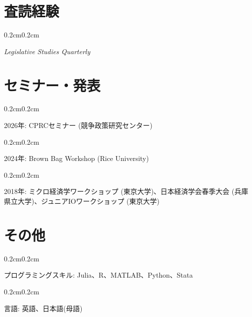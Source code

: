 \documentclass[10pt, letterpaper]{article}
\newenvironment{onecolentry}{
    \begin{adjustwidth}{0.2cm}{0.2cm}
}{
    \end{adjustwidth}
}
\begin{document}
    \section{査読経験}
    \begin{onecolentry}
        \textit{Legislative Studies Quarterly}
    \end{onecolentry}

    \section{セミナー・発表}
    \begin{onecolentry}
        2026年: CPRCセミナー (競争政策研究センター)
    \end{onecolentry}
    \begin{onecolentry}
        2024年: Brown Bag Workshop (Rice University)
    \end{onecolentry}
    \begin{onecolentry}
        2018年: ミクロ経済学ワークショップ (東京大学)、日本経済学会春季大会 (兵庫県立大学)、ジュニアIOワークショップ (東京大学)
    \end{onecolentry}

    \section{その他}
    \begin{onecolentry}
        プログラミングスキル: Julia、R、MATLAB、Python、Stata
    \end{onecolentry}
    \begin{onecolentry}
        言語: 英語、日本語(母語)
    \end{onecolentry}
\end{document}
